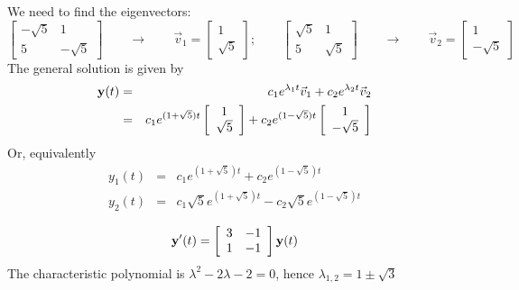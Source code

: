 We need to find the eigenvectors:
$$
\left[\begin{array}{cc}-\sqrt{5}&1\\5&-\sqrt{5}\end{array}\right]\qquad\rightarrow\qquad
\vec{v}_1=\left[\begin{array}{c}1\\\sqrt{5}\end{array}\right];\qquad
\left[\begin{array}{cc}\sqrt{5}&1\\5&\sqrt{5}\end{array}\right]\qquad\rightarrow\qquad
\vec{v}_2=\left[\begin{array}{c}1\\-\sqrt{5}\end{array}\right]
$$
The general solution is given by
\begin{eqnarray*}
{\bf y}(t)&=&c_1e^{\lambda_1t}\vec{v}_1 + c_2e^{\lambda_2t}\vec{v}_2\\
&=&c_1e^{(1+\sqrt{5})t}\left[\begin{array}{c}1\\ \sqrt{5}\end{array}\right] + c_2e^{(1-\sqrt{5})t}\left[\begin{array}{c}1\\-\sqrt{5}\end{array}\right]
\end{eqnarray*}
Or, equivalently
\begin{eqnarray*}
y_1(t)&=&c_1e^{(1+\sqrt{5})t} + c_2e^{(1-\sqrt{5})t}\\
y_2(t)&=&c_1\sqrt{5}e^{(1+\sqrt{5})t} - c_2\sqrt{5} e^{(1-\sqrt{5})t}
\end{eqnarray*}

\vspace{2mm}
$$
{\bf y}'(t)=\left[\begin{array}{cc}3&-1\\1&-1\end{array}\right]{\bf y}(t)
$$
The characteristic polynomial is $\lambda^2-2\lambda-2=0$, hence $\lambda_{1,2}=1\pm\sqrt{3}$

